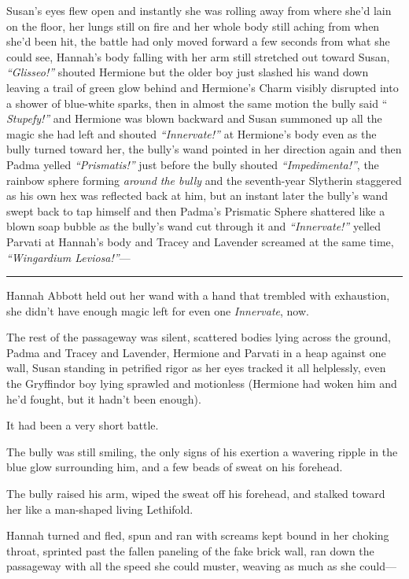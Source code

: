 Susan's eyes flew open and instantly she was rolling away from where
she'd lain on the floor, her lungs still on fire and her whole body
still aching from when she'd been hit, the battle had only moved forward
a few seconds from what she could see, Hannah's body falling with her
arm still stretched out toward Susan, \emph{``Glisseo!''} shouted
Hermione but the older boy just slashed his wand down leaving a trail of
green glow behind and Hermione's Charm visibly disrupted into a shower
of blue-white sparks, then in almost the same motion the bully said ``
\emph{Stupefy!''} and Hermione was blown backward and Susan summoned up
all the magic she had left and shouted \emph{``Innervate!''} at
Hermione's body even as the bully turned toward her, the bully's wand
pointed in her direction again and then Padma yelled
\emph{``Prismatis!''} just before the bully shouted
\emph{``Impedimenta!''}, the rainbow sphere forming \emph{around the
bully} and the seventh-year Slytherin staggered as his own hex was
reflected back at him, but an instant later the bully's wand swept back
to tap himself and then Padma's Prismatic Sphere shattered like a blown
soap bubble as the bully's wand cut through it and \emph{``Innervate!''}
yelled Parvati at Hannah's body and Tracey and Lavender screamed at the
same time, \emph{``Wingardium Leviosa!''}---

\begin{center}\rule{3in}{0.4pt}\end{center}

Hannah Abbott held out her wand with a hand that trembled with
exhaustion, she didn't have enough magic left for even one
\emph{Innervate}, now.

The rest of the passageway was silent, scattered bodies lying across the
ground, Padma and Tracey and Lavender, Hermione and Parvati in a heap
against one wall, Susan standing in petrified rigor as her eyes tracked
it all helplessly, even the Gryffindor boy lying sprawled and motionless
(Hermione had woken him and he'd fought, but it hadn't been enough).

It had been a very short battle.

The bully was still smiling, the only signs of his exertion a wavering
ripple in the blue glow surrounding him, and a few beads of sweat on his
forehead.

The bully raised his arm, wiped the sweat off his forehead, and stalked
toward her like a man-shaped living Lethifold.

Hannah turned and fled, spun and ran with screams kept bound in her
choking throat, sprinted past the fallen paneling of the fake brick
wall, ran down the passageway with all the speed she could muster,
weaving as much as she could---

